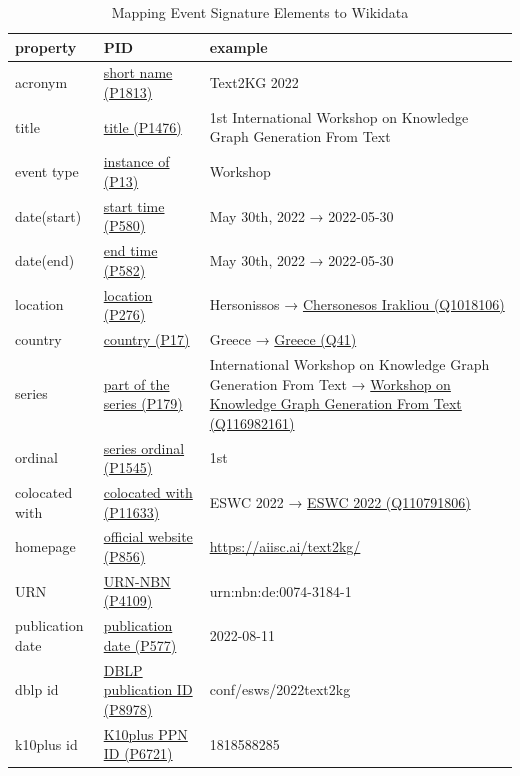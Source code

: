 \documentclass[]{ceurart}
\newcommand{\wdpTable}[2]{\href{https://www.wikidata.org/wiki/Property:#2}{#1 (#2)}}
\newcommand{\wdqTable}[2]{\href{https://www.wikidata.org/wiki/#2}{#1 (#2)}}
\begin{document}
\begin{table}
\caption{Mapping Event Signature Elements to Wikidata}
\label{tab:wikidata_mapping}
\begin{tabular}{p{2.5cm}p{3.7cm}p{6cm}}
\toprule
property & PID & example\\
\midrule
acronym     & \wdpTable{short name}{P1813} & Text2KG 2022 \\
title       & \wdpTable{title}{P1476} & 1st International Workshop \newline on Knowledge Graph Generation From Text \\
\midrule
event type  & \wdpTable{instance of}{P13} & Workshop\\
date(start) & \wdpTable{start time}{P580} & May 30th, 2022 → 2022-05-30\\
date(end)   & \wdpTable{end time}{P582} & May 30th, 2022 → 2022-05-30\\
location    & \wdpTable{location}{P276} & Hersonissos → \wdqTable{Chersonesos Irakliou}{Q1018106}\\
country     & \wdpTable{country}{P17}  & Greece → \wdqTable{Greece}{Q41}\\
series      & \wdpTable{part of the series}{P179}  &  International Workshop on Knowledge Graph Generation From Text → \wdqTable{Workshop on Knowledge Graph Generation From Text}{Q116982161}\\
ordinal     & \wdpTable{series ordinal}{P1545} & 1st\\
colocated with & \wdpTable{colocated with}{P11633} & ESWC 2022 → \wdqTable{ESWC 2022}{Q110791806}\\
homepage & \wdpTable{official website}{P856}& \href{ https://aiisc.ai/text2kg/
}{ https://aiisc.ai/text2kg/
}\\
\midrule
URN & \wdpTable{URN-NBN}{P4109} & urn:nbn:de:0074-3184-1 \\
publication date & \wdpTable{publication date}{P577} & 2022-08-11 \\
dblp id & \wdpTable{DBLP publication ID}{P8978} &  conf/esws/2022text2kg \\
k10plus id &\wdpTable{K10plus PPN ID}{P6721} & 1818588285\\
\bottomrule
\end{tabular}
\end{table}
\end{document}
